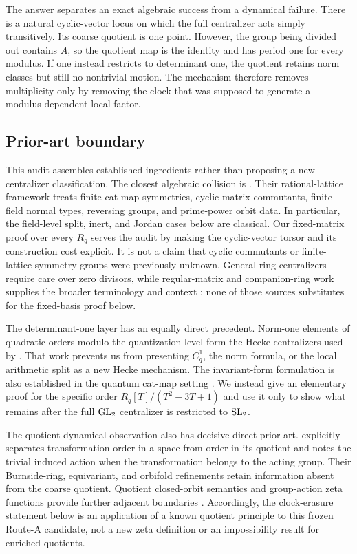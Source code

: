 \documentclass[11pt]{article}
\theoremstyle{definition}
\theoremstyle{remark}
\begin{document}
The answer separates an exact algebraic success from a dynamical failure.
There is a natural cyclic-vector locus on which the full centralizer acts
simply transitively.  Its coarse quotient is one point.  However, the group
being divided out contains \(A\), so the quotient map is the identity and
has period one for every modulus.  If one instead restricts to determinant
one, the quotient retains norm classes but still no nontrivial motion.  The
mechanism therefore removes multiplicity only by removing the clock that was
supposed to generate a modulus-dependent local factor.

\subsection{Prior-art boundary}

This audit assembles established ingredients rather than proposing a
new centralizer classification.  The closest algebraic collision is
\citet{BaakeNeumaerkerRoberts2013}.  Their rational-lattice framework treats
finite cat-map symmetries, cyclic-matrix commutants, finite-field normal
types, reversing groups, and prime-power orbit data.  In particular, the
field-level split, inert, and Jordan cases below are classical.  Our
fixed-matrix proof over every \(R_q\) serves the audit by making the
cyclic-vector torsor and its construction cost explicit.  It is not a claim
that cyclic commutants or finite-lattice symmetry groups were previously
unknown.  General ring centralizers require care over zero divisors, while
regular-matrix and companion-ring work supplies the broader terminology and
context \citep{Marais2014,Stasinski2016,NoferiniWilliams2024}; none of those
sources substitutes for the fixed-basis proof below.

The determinant-one layer has an equally direct precedent.  Norm-one
elements of quadratic orders modulo the quantization level form the Hecke
centralizers used by \citet{KurlbergRudnick2000}.  That work prevents us from
presenting \(C_q^1\), the norm formula, or the local arithmetic split as a new
Hecke mechanism.  The invariant-form formulation is also established in the
quantum cat-map setting \citep{KurlbergRosenzweigRudnick2007}.  We instead
give an elementary proof for the specific
order \(R_q[T]/(T^2-3T+1)\) and use it only to show what remains after the
full \(\mathrm{GL}_2\) centralizer is restricted to \(\mathrm{SL}_2\).

The quotient-dynamical observation also has decisive direct prior art.
\citet{GuseinZadeLuengoMelle2015} explicitly separates transformation order
in a space from order in its quotient and notes the trivial induced action
when the transformation belongs to the acting group.  Their Burnside-ring,
equivariant, and orbifold refinements retain information absent from the
coarse quotient.  Quotient closed-orbit semantics and group-action zeta
functions provide further adjacent boundaries
\citep{Zegowitz2017,Miles2017}.  Accordingly, the clock-erasure statement below is an
application of a known quotient principle to this frozen Route-A candidate,
not a new zeta definition or an impossibility result for enriched quotients.
\end{document}
